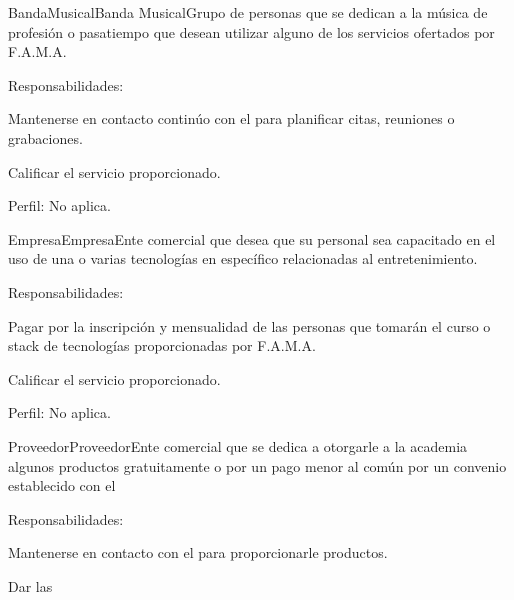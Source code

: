 \begin{actor}{BandaMusical}{Banda Musical}{Grupo de personas que se dedican a la música de profesión o pasatiempo que desean utilizar alguno de los servicios ofertados por F.A.M.A.}
\item[Responsabilidades:]\cdtEmpty
	\begin{Citemize}
		\item Mantenerse en contacto continúo con el  para planificar citas, reuniones o grabaciones.
		\item Calificar el servicio proporcionado.
	\end{Citemize}
\item[Perfil:]No aplica.
\end{actor}

\begin{actor}{Empresa}{Empresa}{Ente comercial que desea que su personal sea capacitado en el uso de una o varias tecnologías en específico relacionadas al entretenimiento.}
\item[Responsabilidades:]\cdtEmpty
	\begin{Citemize}
		\item Pagar por la inscripción y mensualidad de las personas que tomarán el curso o stack de tecnologías proporcionadas por F.A.M.A.
		\item Calificar el servicio proporcionado.
	\end{Citemize}
\item[Perfil:] No aplica.
\end{actor}

\begin{actor}{Proveedor}{Proveedor}{Ente comercial que se dedica a otorgarle a la academia algunos productos gratuitamente o por un pago menor al común por un convenio establecido con el }
\item[Responsabilidades:]\cdtEmpty
	\begin{Citemize}
		\item Mantenerse en contacto con el  para proporcionarle productos.
		\item Dar las 
	\end{Citemize}
\end{actor}